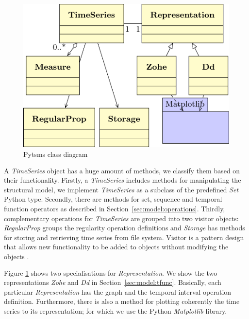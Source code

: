 \begin{figure}[tp]
  \centering
  \includegraphics{fig/fig_pytsms_uml}
  \caption{Pytsms  class diagram}
  \label{fig:implementacio:pytsms-uml}
\end{figure}




A \emph{TimeSeries} object has a huge amount of methods, we classify
them based on their functionality. Firstly, a \emph{TimeSeries}
includes methods for manipulating the structural model, we implement
\emph{TimeSeries} as a subclass of the predefined \emph{Set} Python
type. Secondly, there are methods for set, sequence and temporal
function operators as described in Section~\ref{sec:model:operations}.
Thirdly, complementary operations for \emph{TimeSeries} are grouped
into two visitor objects: \emph{RegularProp} groups the regularity
operation definitions and \emph{Storage} has methods for storing and
retrieving time series from file system. Visitor is a pattern design
that allows new functionality to be added to objects without modifying
the objects
\cite{ziade08:expert_python_programming:visitor,martin02:visitor}.


Figure \ref{fig:implementacio:pytsms-uml} shows two specialisations
for \emph{Representation}. We show the two representations \emph{Zohe}
and \emph{Dd} in Section~\ref{sec:model:tfunc}. Basically, each
particular \emph{Representation} has the graph and the temporal
interval operation definition. Furthermore, there is also a method for
plotting coherently the time series to its representation; for which
we use the Python \emph{Matplotlib} library.



